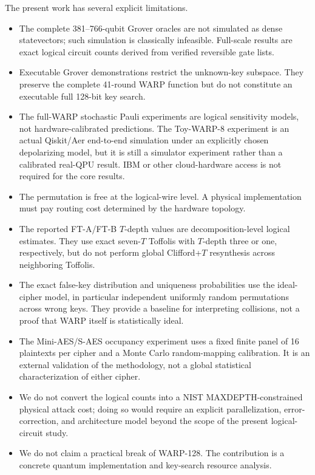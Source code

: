 \documentclass[pdflatex,sn-nature]{sn-jnl}
\theoremstyle{thmstyleone}
\theoremstyle{thmstyletwo}
\begin{document}
The present work has several explicit limitations.
\begin{itemize}
    \item The complete 381--766-qubit Grover oracles are not simulated as dense statevectors; such simulation is classically infeasible. Full-scale results are exact logical circuit counts derived from verified reversible gate lists.
    \item Executable Grover demonstrations restrict the unknown-key subspace. They preserve the complete 41-round WARP function but do not constitute an executable full 128-bit key search.
    \item The full-WARP stochastic Pauli experiments are logical sensitivity models, not hardware-calibrated predictions. The Toy-WARP-8 experiment is an actual Qiskit/Aer end-to-end simulation under an explicitly chosen depolarizing model, but it is still a simulator experiment rather than a calibrated real-QPU result. IBM or other cloud-hardware access is not required for the core results.
    \item The permutation is free at the logical-wire level. A physical implementation must pay routing cost determined by the hardware topology.
    \item The reported FT-A/FT-B $T$-depth values are decomposition-level logical estimates. They use exact seven-$T$ Toffolis with $T$-depth three or one, respectively, but do not perform global Clifford+$T$ resynthesis across neighboring Toffolis.
    \item The exact false-key distribution and uniqueness probabilities use the ideal-cipher model, in particular independent uniformly random permutations across wrong keys.  They provide a baseline for interpreting collisions, not a proof that WARP itself is statistically ideal.
    \item The Mini-AES/S-AES occupancy experiment uses a fixed finite panel of 16 plaintexts per cipher and a Monte Carlo random-mapping calibration.  It is an external validation of the methodology, not a global statistical characterization of either cipher.
    \item We do not convert the logical counts into a NIST MAXDEPTH-constrained physical attack cost; doing so would require an explicit parallelization, error-correction, and architecture model beyond the scope of the present logical-circuit study.
    \item We do not claim a practical break of WARP-128. The contribution is a concrete quantum implementation and key-search resource analysis.
\end{itemize}
\end{document}
